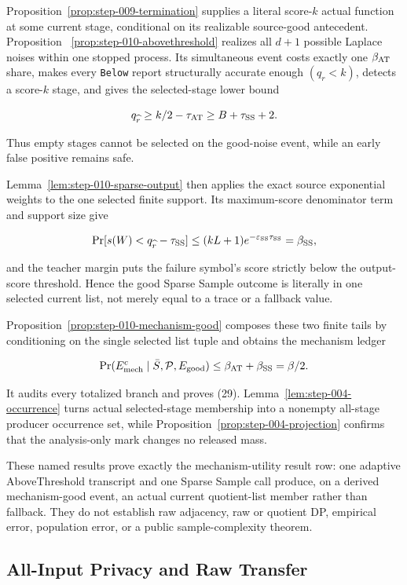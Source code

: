 Proposition~\ref{prop:step-009-termination} supplies a literal
score-\(k\) actual function at some current stage, conditional on its
 realizable source-good antecedent. Proposition
~\ref{prop:step-010-abovethreshold} realizes all \(d+1\) possible Laplace
noises within one stopped process. Its simultaneous event costs exactly one
\(\beta_{\rm AT}\) share, makes every \texttt{Below} report structurally accurate
enough \((q_r<k)\), detects a score-\(k\) stage, and gives the selected-stage
lower bound

\[
 q_{\widehat r}\geq k/2-\tau_{\rm AT}
 \geq B+\tau_{\rm SS}+2.
\]

Thus empty stages cannot be selected on the good-noise event, while an
early false positive remains safe.

Lemma~\ref{lem:step-010-sparse-output} then applies the exact source
exponential weights to the one selected finite support. Its maximum-score
denominator term and support size give

\[
 \Pr[s(W)<q_{\widehat r}-\tau_{\rm SS}]
 \leq(kL+1)e^{-\varepsilon_{\rm SS}\tau_{\rm SS}}
 =\beta_{\rm SS},
\]

and the teacher margin puts the failure symbol's score strictly below the
 output-score threshold. Hence the good Sparse Sample outcome is
literally in one selected current list, not merely equal to a trace or a
fallback value.

Proposition~\ref{prop:step-010-mechanism-good} composes these two finite
tails by conditioning on the single selected list tuple and obtains the
mechanism ledger

\[
 \Pr(E_{\rm mech}^c\mid\bar S,\mathcal P,E_{\rm good})
 \leq\beta_{\rm AT}+\beta_{\rm SS}=\beta/2.
\]

It audits every totalized branch and proves (29). Lemma~\ref{lem:step-004-occurrence} turns actual selected-stage membership
into a nonempty all-stage producer occurrence set, while Proposition~\ref{prop:step-004-projection} confirms that the analysis-only
mark changes no released mass.

These named results prove exactly the mechanism-utility result row: one adaptive
AboveThreshold transcript and one Sparse Sample call produce, on a derived
mechanism-good event, an actual current quotient-list member rather than
fallback. They do not establish raw adjacency, raw or quotient DP,
empirical error, population error, or a public sample-complexity theorem.



\subsection{All-Input Privacy and Raw Transfer}\label{app:step_011}

